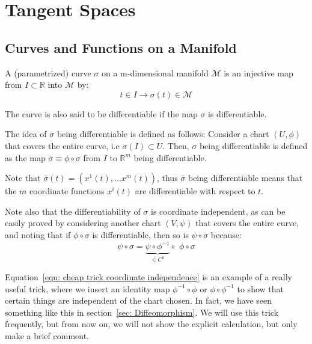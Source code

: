 \chapter{Tangent Spaces}
  \section{Curves and Functions on a Manifold}
    \begin{definition}
      A (parametrized) curve $\sigma$ on a m-dimensional manifold
      $\mathcal{M}$ is an injective map from $I\subset \mathbb{R}$ into
      $\mathcal{M}$ by:
      \begin{equation*}
        t\in I \rightarrow \sigma(t) \in \mathcal{M}
      \end{equation*}
    \end{definition}
      The curve is also said to be differentiable if the map $\sigma$ is
      differentiable.
    \begin{definition}
      The idea of $\sigma$ being differentiable is defined as follows:
      Consider a chart $(U, \phi)$ that covers the entire curve, i.e
      $\sigma(I) \subset U$. Then, $\sigma$ being differentiable is defined
      as the map $\bar{\sigma} \equiv \phi \circ \sigma$ from $I$ to
      $\mathbb{R}^m$ being differentiable.

      Note that $\bar{\sigma}(t) = \left(x^1(t),...x^m(t)\right)$, thus
      $\bar{\sigma}$ being differentiable means that the $m$ coordinate
      functions ${x^i(t)}$ are differentiable with respect to $t$. 

      Note also that the differentiability of $\sigma$ is coordinate
      independent, as can be easily proved by considering another chart
      $(V,\psi)$ that covers the entire curve, and noting that if $\phi
      \circ \sigma$ is differentiable, then so is $\psi \circ \sigma$
      because:
      \begin{equation}
        \label{eqn: cheap trick coordinate independence}
        \psi \circ \sigma = \underbrace{\psi \circ \phi^{-1}}_{\in C^k}
        \circ  \, \, \phi \circ \sigma
      \end{equation}
    \end{definition}
    \begin{remark}
      Equation~\ref{eqn: cheap trick coordinate independence} is an example
      of a really useful trick, where we insert an identity map $\phi^{-1}
      \circ \phi$ or $\phi \circ \phi^{-1}$ to show that certain things are
      independent of the chart chosen. In fact, we have seen something like
      this in section~\ref{sec: Diffeomorphism}. We will use this trick
      frequently, but from now on, we will not show the explicit calculation, but only make a brief comment.
    \end{remark}
